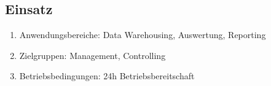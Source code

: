 \subsection{Einsatz}

\begin{enumerate}
  \item Anwendungsbereiche: Data Warehousing, Auswertung, Reporting
  \item Zielgruppen: Management, Controlling
  \item Betriebsbedingungen: 24h Betriebsbereitschaft
\end{enumerate}
